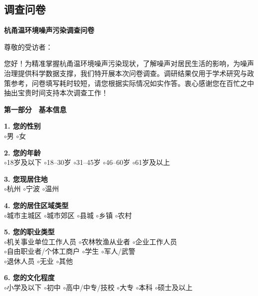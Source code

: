 \newpage

\begin{appendices}
\section{调查问卷}

\begin{center}
\textbf{杭甬温环境噪声污染调查问卷}
\end{center}

尊敬的受访者：

您好！为精准掌握杭甬温环境噪声污染现状，了解噪声对居民生活的影响，为噪声治理提供科学数据支撑，我们特开展本次问卷调查。调研结果仅用于学术研究与政策参考，问卷填写耗时较短，请您根据实际情况如实作答。衷心感谢您在百忙之中抽出宝贵时间支持本次调查工作！

\begin{center}
\textbf{第一部分　基本信息}
\end{center}

\textbf{1. 您的性别}\\
$\circ$男 \qquad $\circ$女

\textbf{2. 您的年龄}\\
$\circ$18岁及以下 \quad $\circ$18–30岁 \quad $\circ$31–45岁 \quad $\circ$46–60岁 \quad $\circ$61岁及以上

\textbf{3. 您现居住地}\\
$\circ$杭州 \quad $\circ$宁波 \quad $\circ$温州

\textbf{4. 您的居住区域类型}\\
$\circ$城市主城区 \quad $\circ$城市郊区 \quad $\circ$县城 \quad $\circ$乡镇 \quad $\circ$农村

\textbf{5. 您的职业类型}\\
$\circ$机关事业单位工作人员 \quad $\circ$农林牧渔从业者 \quad $\circ$企业工作人员\\
$\circ$自由职业者/个体工商户 \quad $\circ$学生 \quad $\circ$军人/武警\\
$\circ$退休人员 \quad $\circ$无业 \quad $\circ$其他 \underline{\hspace{3cm}}

\textbf{6. 您的文化程度}\\
$\circ$小学及以下 \quad $\circ$初中 \quad $\circ$高中/中专/技校 \quad $\circ$大专 \quad $\circ$本科 \quad $\circ$硕士及以上


\end{appendices}
